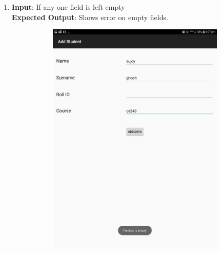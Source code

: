 \documentclass{scrreprt}
\begin{document}
\begin{itemize}
\begin{enumerate}
\item \textbf{Input}: If any one field is left empty\\
\textbf{Expected Output}: Shows error on empty fields.
\begin{figure}[H]
\begin{subfigure}{0.5\textwidth}
\includegraphics[width=0.85\linewidth, keepaspectratio]{addempty1.jpg} 
\label{fig:subim1}
\end{subfigure}
\begin{subfigure}{0.5\textwidth}

\end{subfigure}
\end{figure}
\end{enumerate}
\end{itemize}
\end{document}

